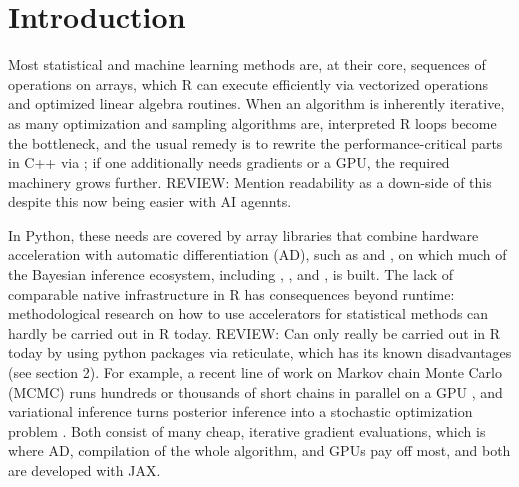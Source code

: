 \section{Introduction}\label{intro}

Most statistical and machine learning methods are, at their core, sequences of operations on arrays, which R can execute efficiently via vectorized operations and optimized linear algebra routines.
When an algorithm is inherently iterative, as many optimization and sampling algorithms are, interpreted R loops become the bottleneck, and the usual remedy is to rewrite the performance-critical parts in C++ via  \citep{ref-rcpp}; if one additionally needs gradients or a GPU, the required machinery grows further.
REVIEW: Mention readability as a down-side of this despite this now being easier with AI agennts.

In Python, these needs are covered by array libraries that combine hardware acceleration with automatic differentiation (AD), such as  \citep{ref-pytorch} and  \citep{ref-jax, ref-frostig2018compiling}, on which much of the Bayesian inference ecosystem, including  \citep{ref-numpyro},  \citep{ref-blackjax}, and  \citep{ref-tfp}, is built.
The lack of comparable native infrastructure in R has consequences beyond runtime: methodological research on how to use accelerators for statistical methods can hardly be carried out in R today.
REVIEW: Can only really be carried out in R today by using python packages via reticulate, which has its known disadvantages (see section 2).
For example, a recent line of work on Markov chain Monte Carlo (MCMC) runs hundreds or thousands of short chains in parallel on a GPU \citep{ref-chees, ref-meads, ref-nested-rhat}, and variational inference \citep{ref-blei2017vi} turns posterior inference into a stochastic optimization problem \citep{ref-hoffman2013svi, ref-kucukelbir2017advi}.
Both consist of many cheap, iterative gradient evaluations, which is where AD, compilation of the whole algorithm, and GPUs pay off most, and both are developed with JAX.

